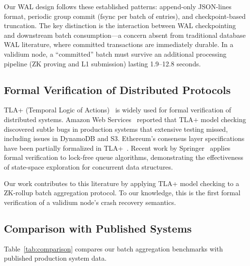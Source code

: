Our WAL design follows these established patterns: append-only JSON-lines format,
periodic group commit (fsync per batch of entries), and checkpoint-based truncation.
The key distinction is the interaction between WAL checkpointing and downstream
batch consumption---a concern absent from traditional database WAL literature,
where committed transactions are immediately durable. In a validium node, a
``committed'' batch must survive an additional processing pipeline (ZK proving
and L1 submission) lasting 1.9--12.8 seconds.

\subsection{Formal Verification of Distributed Protocols}

TLA+ (Temporal Logic of Actions)~\cite{lamport2002specifying} is widely used for
formal verification of distributed systems. Amazon Web
Services~\cite{newcombe2015aws} reported that TLA+ model checking discovered
subtle bugs in production systems that extensive testing missed, including issues
in DynamoDB and S3. Ethereum's consensus layer specifications have been partially
formalized in TLA+~\cite{zksec2024formal}. Recent work by
Springer~\cite{springer2024lockfree} applies formal verification to lock-free
queue algorithms, demonstrating the effectiveness of state-space exploration for
concurrent data structures.

Our work contributes to this literature by applying TLA+ model checking to a
ZK-rollup batch aggregation protocol. To our knowledge, this is the first formal
verification of a validium node's crash recovery semantics.

\subsection{Comparison with Published Systems}

Table~\ref{tab:comparison} compares our batch aggregation benchmarks with
published production system data.

